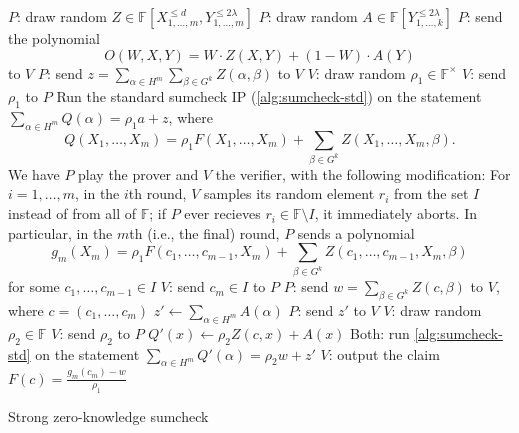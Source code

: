 \documentclass[english,12pt]{reedthesis}
\theoremstyle{plain}
\theoremstyle{definition}
\theoremstyle{remark}
\begin{document}
\begin{algorithm}[htbp]
  $P$: draw random
  $Z \in \mathbb{F}[X_{1, \ldots, m}^{\le d}, Y_{1, \ldots, m}^{\le 2\lambda}]$\;
  $P$: draw random $A \in \mathbb{F}[Y_{1, \ldots, k}^{\le 2\lambda}]$\;
  $P$: send the polynomial
  \[
    O(W, X, Y) = W \cdot Z(X, Y) + (1 - W) \cdot A(Y)
  \]
  to $V$\;
  $P$: send $z = \sum_{\alpha \in H^{m}}\sum_{\beta \in G^{k}}Z(\alpha, \beta)$ to $V$\;
  $V$: draw random $\rho_{1} \in \mathbb{F}^{\times}$\;
  $V$: send $\rho_{1}$ to $P$\;
  Run the standard sumcheck IP (\cref{alg:sumcheck-std}) on the statement
  $\sum_{\alpha \in H^{m}}Q(\alpha) = \rho_{1}a + z$, where
  \[
    Q(X_{1}, \ldots, X_{m}) = \rho_{1}F(X_{1}, \ldots, X_{m}) + \sum_{\beta \in G^{k}}Z(X_{1}, \ldots, X_{m}, \beta).
  \]
  We have $P$ play the prover and $V$ the verifier, with the following
  modification: For $i = 1, \ldots, m$, in the $i$th round, $V$ samples its random
  element $r_{i}$ from the set $I$ instead of from all of $\mathbb{F}$; if $P$
  ever recieves $r_{i} \in \mathbb{F} \setminus I$, it immediately aborts. In particular,
  in the $m$th (i.e., the final) round, $P$ sends a polynomial
  \[
    g_{m}(X_{m}) = \rho_{1}F(c_{1}, \ldots, c_{m-1}, X_{m}) + \sum_{\beta \in G^{k}}Z(c_{1}, \ldots, c_{m-1}, X_{m}, \beta)
  \]
  for some $c_{1}, \ldots, c_{m-1} \in I$\;
  $V$: send $c_{m} \in I$ to $P$\;
  $P$: send $w = \sum_{\beta \in G^{k}}Z(c, \beta)$ to $V$, where $c = (c_{1}, \ldots, c_{m})$\;
  $z' \leftarrow \sum_{\alpha \in H^{m}}A(\alpha)$\;
  $P$: send $z'$ to $V$\;
  $V$: draw random $\rho_{2} \in \mathbb{F}$\;
  $V$: send $\rho_{2}$ to $P$\;
  $Q'(x) \leftarrow \rho_{2}Z(c, x) + A(x)$\;
  Both: run \cref{alg:sumcheck-std} on the statement
  $\sum_{\alpha \in H^{m}}Q'(\alpha) = \rho_{2}w + z'$\;
  $V$: output the claim $F(c) = \frac{g_{m}(c_{m}) - w}{\rho_{1}}$\;
  \caption{Strong zero-knowledge sumcheck~\cite[Construction 3]{CFGS22}}\label{alg:zk-sumcheck}
\end{algorithm}
\end{document}
